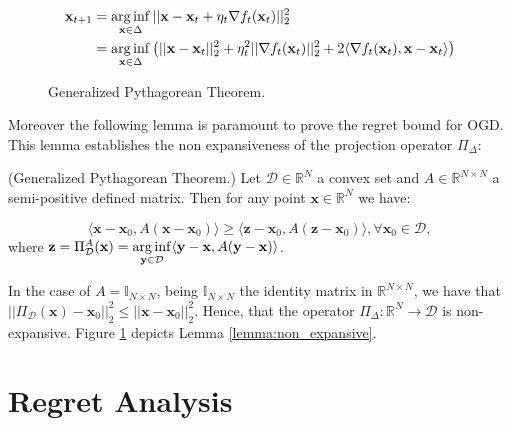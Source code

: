 \begin{align}
	\mathbf x_{t+1}&=\operatorname*{arg\,inf}\limits_{\mathbf x\in\Delta}||\mathbf x-\mathbf x_t+\eta_t\nabla f_t(\mathbf x_t)||_2^2\\
	&=\operatorname*{arg\,inf}\limits_{\mathbf x\in\Delta}\left(||\mathbf x-\mathbf x_t||_2^2+\eta_t^2||\nabla f_t(\mathbf x_t)||_2^2+2\langle\nabla f_t(\mathbf x_t),\mathbf x-\mathbf x_t\rangle\right)
\end{align}

\begin{figure}[ht!]
\centering

\caption{Generalized Pythagorean Theorem.}
\label{fig:pitagora}
\end{figure}

\vspace{1cm}

Moreover the following lemma is paramount to prove the regret bound for OGD. This lemma establishes the non expansiveness of the projection operator $\Pi_\Delta$:

\begin{lemma}(Generalized Pythagorean Theorem.)\label{lemma:non_expansive}
Let $\mathcal D\in\mathbb R^N$ a convex set and $A\in\mathbb R^{N\times N}$ a semi-positive defined matrix. Then for any point $\mathbf x\in\mathbb R^N$ we have:

\begin{equation}
\langle\mathbf x-\mathbf x_0,A(\mathbf x-\mathbf x_0) \rangle\ge\langle\mathbf z-\mathbf x_0,A(\mathbf z-\mathbf x_0)\rangle, \forall\mathbf x_0\in\mathcal D,
\end{equation}
where $\mathbf z=\Pi_{\mathcal D}^A(\mathbf x)=\operatorname*{arg\,inf}\limits_{\mathbf y\in\mathcal D}\langle\mathbf y-\mathbf x,A(\mathbf y-\mathbf x)\rangle$.
\end{lemma}

In the case of $A=\mathbb I_{N\times N}$, being $\mathbb I_{N\times N}$ the identity matrix in $\mathbb R^{N\times N}$, we have that $||\Pi_\mathcal D(\mathbf x)-\mathbf x_0||_2^2\le||\mathbf x-\mathbf x_0||_2^2$. Hence, that the operator $\Pi_\Delta:\mathbb R^N\to\mathcal D$ is non-expansive. Figure \ref{fig:pitagora} depicts Lemma \ref{lemma:non_expansive}.

\section{Regret Analysis}

